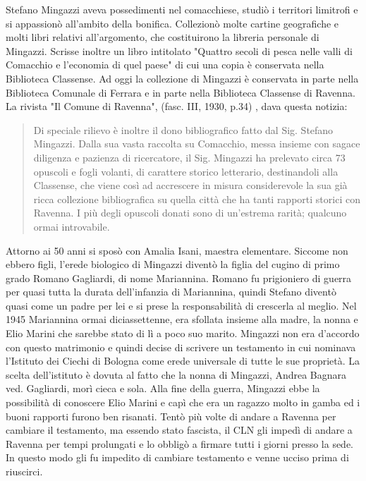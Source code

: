 Stefano Mingazzi aveva possedimenti nel comacchiese, studiò i territori limitrofi e si appassionò all'ambito della bonifica. Collezionò molte cartine geografiche e molti libri relativi all'argomento, che costituirono la libreria personale di Mingazzi. Scrisse inoltre un libro intitolato "Quattro secoli di pesca nelle valli di Comacchio e l'economia di quel paese" di cui una copia è conservata nella Biblioteca Classense. Ad oggi la collezione di Mingazzi è conservata in parte nella Biblioteca Comunale di Ferrara e in parte nella Biblioteca Classense di Ravenna. La rivista "Il Comune di Ravenna", (fasc. III, 1930, p.34) , dava questa notizia:
\begin{quotation}
  Di speciale rilievo è inoltre il dono bibliografico fatto dal Sig. Stefano Mingazzi. Dalla sua vasta raccolta su Comacchio, messa insieme con sagace diligenza e pazienza di ricercatore, il Sig. Mingazzi ha prelevato circa 73 opuscoli e fogli volanti, di carattere storico letterario, destinandoli alla Classense, che viene così ad accrescere in misura considerevole la sua già ricca collezione bibliografica su quella città che ha tanti rapporti storici con Ravenna. I più degli opuscoli donati sono di un'estrema rarità; qualcuno ormai introvabile.
\end{quotation}
Attorno ai 50 anni si sposò con Amalia Isani, maestra elementare. Siccome non ebbero figli, l'erede biologico di Mingazzi diventò la figlia del cugino di primo grado  Romano Gagliardi, di nome Mariannina. Romano fu prigioniero di guerra per quasi tutta la durata dell'infanzia di Mariannina, quindi Stefano diventò quasi come un padre per lei e si prese la responsabilità di crescerla al meglio. Nel 1945 Mariannina ormai diciassettenne, era sfollata insieme alla madre, la nonna e Elio Marini che sarebbe stato di lì a poco suo marito. Mingazzi non era d'accordo con questo matrimonio e quindi decise di scrivere un testamento in cui nominava l'Istituto dei Ciechi di Bologna come erede universale di tutte le sue proprietà. La scelta dell'istituto è dovuta al fatto che la nonna di Mingazzi, Andrea Bagnara ved. Gagliardi, morì cieca e sola. Alla fine della guerra, Mingazzi ebbe la possibilità di conoscere Elio Marini e capì che era un ragazzo molto in gamba ed i buoni rapporti furono ben risanati. Tentò più volte di andare a Ravenna per cambiare il testamento, ma essendo stato fascista, il CLN gli impedì di andare a Ravenna per tempi prolungati e lo obbligò a firmare tutti i giorni presso la sede. In questo modo gli fu impedito di cambiare testamento e venne ucciso prima di riuscirci.\\

